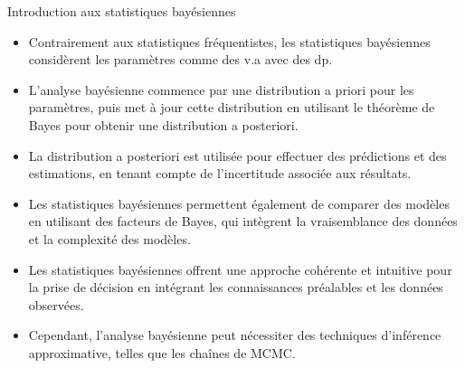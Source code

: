 \documentclass{beamer}
\begin{document}
\begin{frame}{Introduction aux statistiques bayésiennes}
	\begin{itemize}
		\item Contrairement aux statistiques fréquentistes, les statistiques bayésiennes considèrent les paramètres comme des v.a avec des dp.
		\item L'analyse bayésienne commence par une distribution a priori pour les paramètres, puis met à jour cette distribution en utilisant le théorème de Bayes pour obtenir une distribution a posteriori.
		\item La distribution a posteriori est utilisée pour effectuer des prédictions et des estimations, en tenant compte de l'incertitude associée aux résultats.
		\item Les statistiques bayésiennes permettent également de comparer des modèles en utilisant des facteurs de Bayes, qui intègrent la vraisemblance des données et la complexité des modèles.
		\item Les statistiques bayésiennes offrent une approche cohérente et intuitive pour la prise de décision en intégrant les connaissances préalables et les données observées.
		\item Cependant, l'analyse bayésienne peut nécessiter des techniques d'inférence approximative, telles que les chaînes de MCMC.
	\end{itemize}
\end{frame}
\end{document}
